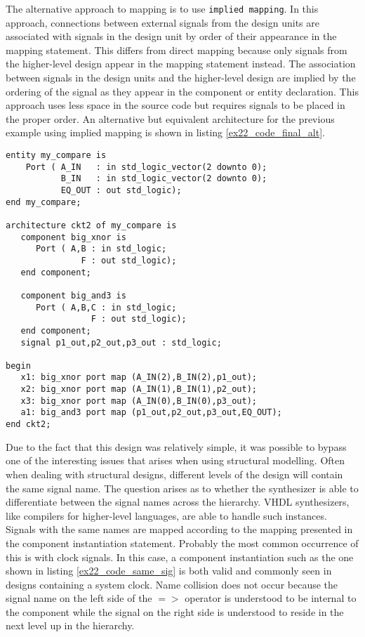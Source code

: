 The alternative approach to mapping is to use \texttt{implied mapping}. In this approach, connections between external signals from the design units are associated with signals in the design unit by order of their appearance in the mapping statement. This differs from direct mapping because only signals from the higher-level design appear in the mapping statement instead. The association between signals in the design units and the higher-level design are implied by the ordering of the signal as they appear in the component or entity declaration. This approach uses less space in the source code but requires signals to be placed in the proper order. An alternative but equivalent architecture for the previous example using implied mapping is shown in listing \ref{ex22_code_final_alt}. 

\begin{lstlisting}[label=ex22_code_final_alt, caption=Alternative architecture for EXAMPLE 22 using implied mapping.]
entity my_compare is
    Port ( A_IN   : in std_logic_vector(2 downto 0);
           B_IN   : in std_logic_vector(2 downto 0);
           EQ_OUT : out std_logic);
end my_compare;

architecture ckt2 of my_compare is 
   component big_xnor is
      Port ( A,B : in std_logic;
               F : out std_logic);
   end component;

   component big_and3 is
      Port ( A,B,C : in std_logic;
                 F : out std_logic);
   end component;
   signal p1_out,p2_out,p3_out : std_logic; 

begin
   x1: big_xnor port map (A_IN(2),B_IN(2),p1_out); 
   x2: big_xnor port map (A_IN(1),B_IN(1),p2_out); 
   x3: big_xnor port map (A_IN(0),B_IN(0),p3_out);   
   a1: big_and3 port map (p1_out,p2_out,p3_out,EQ_OUT); 
end ckt2;
\end{lstlisting}

Due to the fact that this design was relatively simple, it was possible to bypass one of the interesting issues that arises when using structural modelling. Often when dealing with structural designs, different levels of the design will contain the same signal name. The question arises as to whether the synthesizer is able to differentiate between the signal names across the hierarchy. VHDL synthesizers, like compilers for higher-level languages, are able to handle such instances. Signals with the same names are mapped according to the mapping presented in the component instantiation statement. Probably the most common occurrence of this is with clock signals. In this case, a component instantiation such as the one shown in listing \ref{ex22_code_same_sig} is both valid and commonly seen in designs containing a system clock. Name collision does not occur because the signal name on the left side of the $=>$ operator is understood to be internal to the component while the signal on the right side is understood to reside in the next level up in the hierarchy.  

